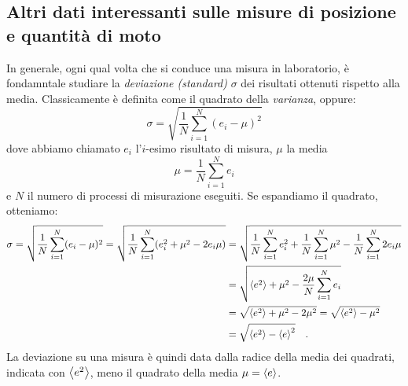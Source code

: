 \subsection{Altri dati interessanti sulle misure di posizione e quantità di moto}
In generale, ogni qual volta che si conduce una misura in laboratorio, è fondamntale studiare la \textit{deviazione (standard)} $\sigma$ dei risultati ottenuti rispetto alla media. Classicamente è definita come il quadrato della \textit{varianza}, oppure:
\[
    \sigma = \sqrt{\frac{1}{N}\sum_{i=1}^N (e_i - \mu)^2}
\]
dove abbiamo chiamato $e_i$ l'$i$-esimo risultato di misura, $\mu$ la media 
\[
    \mu = \frac{1}{N}\sum_{i=1}^N e_i
\]
e $N$ il numero di processi di misurazione eseguiti. Se espandiamo il quadrato, otteniamo:
\[
    \begin{alignedat}{2}
        \sigma = \sqrt{\frac{1}{N}\sum_{i=1}^N (e_i - \mu)^2} = \sqrt{\frac{1}{N}\sum_{i=1}^N (e_i^2 + \mu^2 - 2e_i \mu)} &= \sqrt{\frac{1}{N}\sum_{i=1}^N e_i^2 + \frac{1}{N}\sum_{i=1}^N \mu^2 - \frac{1}{N}\sum_{i=1}^N 2e_i \mu} \\
        &= \sqrt{\left\langle e^2 \right\rangle + \mu^2 - \frac{2\mu}{N}\sum_{i=1}^N e_i} \\
        &= \sqrt{\left\langle e^2 \right\rangle + \mu^2 - 2\mu^2} = \sqrt{\left\langle e^2 \right\rangle - \mu^2} \\
        & = \sqrt{\left\langle e^2 \right\rangle - \left\langle e \right\rangle^2}\quad.
    \end{alignedat}
\]
La deviazione su una misura è quindi data dalla radice della media dei quadrati, indicata con $\left\langle e^2 \right\rangle$, meno il quadrato della media $\mu = \left\langle e \right\rangle$. 

